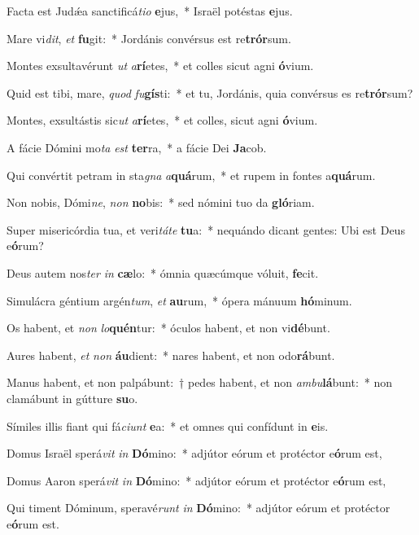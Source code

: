 \item Facta est Judǽa sanctificá\textit{ti}\textit{o} \textbf{e}jus,~* Israël potéstas \textbf{e}jus.
\item Mare vi\textit{dit}, \textit{et} \textbf{fu}git:~* Jordánis convérsus est re\textbf{trór}sum.
\item Montes exsultavérunt \textit{ut} \textit{a}\textbf{rí}etes,~* et colles sicut agni \textbf{ó}vium.
\item Quid est tibi, mare, \textit{quod} \textit{fu}\textbf{gís}ti:~* et tu, Jordánis, quia convérsus es re\textbf{trór}sum?
\item Montes, exsultástis sic\textit{ut} \textit{a}\textbf{rí}etes,~* et colles, sicut agni \textbf{ó}vium.
\item A fácie Dómini mo\textit{ta} \textit{est} \textbf{ter}ra,~* a fácie Dei \textbf{Ja}cob.
\item Qui convértit petram in sta\textit{gna} \textit{a}\textbf{quá}rum,~* et rupem in fontes a\textbf{quá}rum.
\item Non nobis, Dómi\textit{ne}, \textit{non} \textbf{no}bis:~* sed nómini tuo da \textbf{gló}riam.
\item Super misericórdia tua, et veri\textit{tá}\textit{te} \textbf{tu}a:~* nequándo dicant gentes: Ubi est Deus e\textbf{ó}rum?
\item Deus autem nos\textit{ter} \textit{in} \textbf{cæ}lo:~* ómnia quæcúmque vóluit, \textbf{fe}cit.
\item Simulácra géntium argén\textit{tum}, \textit{et} \textbf{au}rum,~* ópera mánuum \textbf{hó}minum.
\item Os habent, et \textit{non} \textit{lo}\textbf{quén}tur:~* óculos habent, et non vi\textbf{dé}bunt.
\item Aures habent, \textit{et} \textit{non} \textbf{áu}dient:~* nares habent, et non odo\textbf{rá}bunt.
\item Manus habent, et non palpábunt:~† pedes habent, et non \textit{am}\textit{bu}\textbf{lá}bunt:~* non clamábunt in gútture \textbf{su}o.
\item Símiles illis fiant qui fá\textit{ci}\textit{unt} \textbf{e}a:~* et omnes qui confídunt in \textbf{e}is.
\item Domus Israël sperá\textit{vit} \textit{in} \textbf{Dó}mino:~* adjútor eórum et protéctor e\textbf{ó}rum est,
\item Domus Aaron sperá\textit{vit} \textit{in} \textbf{Dó}mino:~* adjútor eórum et protéctor e\textbf{ó}rum est,
\item Qui timent Dóminum, speravé\textit{runt} \textit{in} \textbf{Dó}mino:~* adjútor eórum et protéctor e\textbf{ó}rum est.
